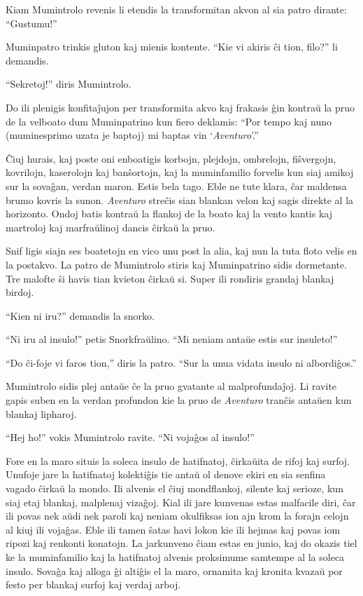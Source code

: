 Kiam Mumintrolo revenis li etendis la transformitan akvon al sia patro dirante: ``Gustumu!''

Muminpatro trinkis gluton kaj mienis kontente. ``Kie vi akiris ĉi tion, filo?'' li demandis.

``Sekretoj!'' diris Mumintrolo.

Do ili plenigis konfitaĵujon per transformita akvo kaj frakasis ĝin kontraŭ la pruo de la velboato dum Muminpatrino kun fiero deklamis: ``Por tempo kaj nuno (muminesprimo uzata je baptoj) mi baptas vin `\emph{Aventuro}'.''

Ĉiuj hurais, kaj poste oni enboatigis korbojn, plejdojn, ombrelojn, fiŝvergojn, kovrilojn, kaserolojn kaj banŝortojn, kaj la muminfamilio forvelis kun siaj amikoj sur la sovaĝan, verdan maron.
\sectionbreak
Estis bela tago. Eble ne tute klara, ĉar maldensa brumo kovris la sunon. \emph{Aventuro} streĉis sian blankan velon kaj sagis direkte al la horizonto. Ondoj batis kontraŭ la flankoj de la boato kaj la vento kantis kaj martroloj kaj marfraŭlinoj dancis ĉirkaŭ la pruo.

Snif ligis siajn ses boatetojn en vico unu post la alia, kaj nun la tuta floto velis en la postakvo. La patro de Mumintrolo stiris kaj Muminpatrino sidis dormetante. Tre malofte ŝi havis tian kvieton ĉirkaŭ si. Super ili rondiris grandaj blankaj birdoj.

``Kien ni iru?'' demandis la snorko.

``Ni iru al insulo!'' petis Snorkfraŭlino. ``Mi neniam antaŭe estis sur insuleto!''

``Do ĉi-foje vi faros tion,'' diris la patro. ``Sur la unua vidata insulo ni albordiĝos.''

Mumintrolo sidis plej antaŭe ĉe la pruo gvatante al malprofundaĵoj. Li ravite gapis suben en la verdan profundon kie la pruo de \emph{Aventuro} tranĉis antaŭen kun blankaj lipharoj.

``Hej ho!'' vokis Mumintrolo ravite. ``Ni vojaĝos al insulo!''

Fore en la maro situis la soleca insulo de hatifnatoj, ĉirkaŭita de rifoj kaj surfoj. Unufoje jare la hatifnatoj kolektiĝis tie antaŭ ol denove ekiri en sia senfina vagado ĉirkaŭ la mondo. Ili alvenis el ĉiuj mondflankoj, silente kaj serioze, kun siaj etaj blankaj, malplenaj vizaĝoj. Kial ili jare kunvenas estas malfacile diri, ĉar ili povas nek aŭdi nek paroli kaj neniam okulfiksas ion ajn krom la forajn celojn al kiuj ili vojaĝas. Eble ili tamen ŝatas havi lokon kie ili hejmas kaj povas iom ripozi kaj renkonti konatojn. La jarkunveno ĉiam estas en junio, kaj do okazis tiel ke la muminfamilio kaj la hatifnatoj alvenis proksimume samtempe al la soleca insulo. Sovaĝa kaj alloga ĝi altiĝis el la maro, ornamita kaj kronita kvazaŭ por festo per blankaj surfoj kaj verdaj arboj.

